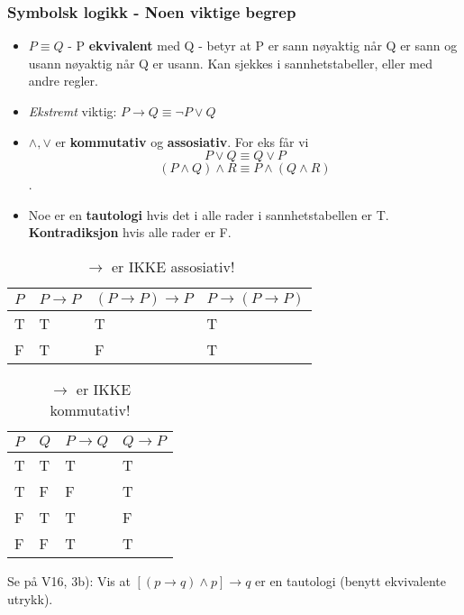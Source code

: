 \documentclass{beamer}
\begin{document}
\begin{frame}
\frametitle{Symbolsk logikk - Noen viktige begrep}
\begin{itemize}
	\item $P \equiv Q$ - P \textbf{ekvivalent} med Q - betyr at P er sann nøyaktig når Q er sann og usann nøyaktig når Q er usann. Kan sjekkes i sannhetstabeller, eller med andre regler.
	\item \textit{Ekstremt} viktig: $P \rightarrow Q \equiv \neg P \vee Q$
	\item $\wedge,\vee$ er \textbf{kommutativ} og \textbf{assosiativ}. For eks får vi \[P \vee Q \equiv Q \vee P\] \[(P \wedge Q) \wedge R \equiv P \wedge (Q \wedge R)\].
	\item Noe er en \textbf{tautologi} hvis det i alle rader i sannhetstabellen er T. \textbf{Kontradiksjon} hvis alle rader er F.
\end{itemize}
\end{frame}

\begin{frame}
\begin{table}[]
	\centering
	\caption{$\rightarrow$ er IKKE assosiativ!}
	\label{my-label}
	\begin{tabular}{|l|l|l|l|}
		\hline
		$P$ & $P \rightarrow P$ & $(P \rightarrow P) \rightarrow P$ & $P \rightarrow (P \rightarrow P)$ \\ \hline
		T& T&  T&T  \\ \hline
		F& T&  F&T \\ \hline
	\end{tabular}
\end{table}

\begin{table}[]
	\centering
	\caption{$\rightarrow$ er IKKE kommutativ!}
	\label{my-label}
	\begin{tabular}{|l|l|l|l|}
		\hline
		$P$ & $Q$ & $P \rightarrow Q$ & $Q \rightarrow P$ \\ \hline
		T& T&  T&T  \\ \hline
		T& F&  F&T \\ \hline
		F& T&  T&F \\ \hline
		F& F&  T&T \\ \hline
	\end{tabular}
\end{table}


\end{frame}

\begin{frame}
Se på V16, 3b): Vis at $[(p \rightarrow q) \wedge p] \rightarrow q$ er en tautologi (benytt ekvivalente utrykk).
\end{frame}
\end{document}
